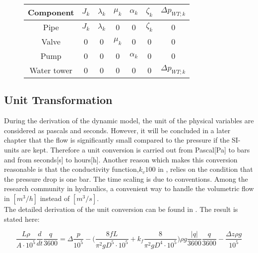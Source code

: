 \begin{figure}[H]
	\centering
\begin{tabular}{c|cccccc} 
		\bfseries Component    &     $J_k$  &$\lambda_k$    &    $\mu_k$    &   $\alpha_k$   &  $\zeta_k$   &  $\Delta p_{WT;k}$ \\\hline
		Pipe			  	   &     $J_k$  &$\lambda_k$    &    0          &   0            &  $\zeta_k$   &  0	    			\\ 
		Valve       	       &     0      &0              &    $\mu_k$    &   0 		     &  0    		&  0					\\ 
		Pump 		    	   &     0      &0              &    0          &   $\alpha_k$   &  0    		&  0	    			\\
		Water tower 	   	   &     0      &0              &    0          &   0            &  0    		&  $\Delta p_{WT;k}$	    
\end{tabular}
		\label{tab:parametrization_model}

\end{figure}	

\subsection{Unit Transformation}
\label{unittransform}

During the derivation of the dynamic model, the unit of the physical variables are considered as pascals and seconds. However, it will be concluded in a later chapter that the flow is significantly small compared to the pressure if the SI-units are kept. Therefore a unit conversion is carried out from Pascal[Pa] to bars and from seconds[s] to hours[h]. Another reason which makes this conversion reasonable is that the conductivity function,$k_v100$ in , relies on the condition that the pressure drop is one bar. The time scaling is due to conventions. Among the research community in hydraulics, a convenient way to handle the volumetric flow in $[m^3/h]$ instead of $[m^3/s]$. 
\\
The detailed derivation of the unit conversion can be found in . The result is stated here: 

\begin{equation}
   \frac{L \rho}{A\cdot10^5} \frac{d}{dt}\frac{q}{3600} = \Delta \frac{p}{10^5} - \Big(\frac{8fL}{\pi^{2}gD^5\cdot10^5} + k_f \frac{8}{\pi^2gD^4\cdot10^5}\Big) \rho g \frac{|q|}{3600} \frac{q}{3600} - \frac{\Delta z \rho g}{10^5}
\end{equation}
